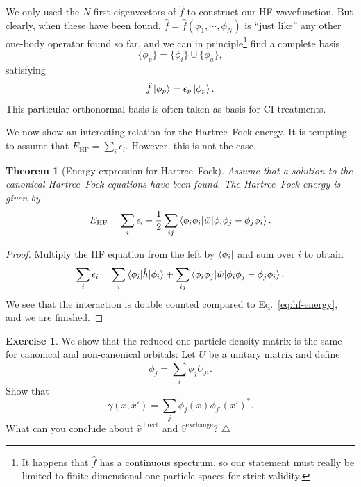 \documentclass{report}
\theoremstyle{plain}
\newtheorem{theorem}{Theorem}[chapter]
\theoremstyle{definition}
\newtheorem{exerc}{Exercise}[chapter]
\newcommand\xqed[1]{%
  \leavevmode\unskip\penalty9999 \hbox{}\nobreak\hfill
  \quad\hbox{#1}}
\newcommand\demo{\xqed{$\triangle$}}
\newenvironment{exercise}{\bigskip\begin{exerc}}{\demo\end{exerc}\bigskip}
\begin{document}
We only used the $N$ first eigenvectors of $\hat{f}$ to construct our
HF wavefunction. But clearly, when these have been found, $\hat{f}=
\hat{f}(\phi_1,\cdots,\phi_N)$ is ``just like'' any other one-body
operator found so far, and we can in principle\footnote{It happens
  that $\hat{f}$ has a continuous spectrum, so our statement must
  really be limited to finite-dimensional one-particle spaces for
  strict validity.} find a complete basis
\begin{equation}
  \{ \phi_p \} = \{\phi_i \} \cup \{\phi_a\},
\end{equation}
satisfying
\begin{equation}
  \hat{f}\ket{\phi_p} = \epsilon_p \ket{\phi_p}. \label{eq:hf-can-all}
\end{equation}
This particular orthonormal basis is often taken as basis for CI
treatments. 

We now show an interesting relation for the Hartree--Fock energy. It
is tempting to assume that $E_\text{HF} = \sum_i \epsilon_i$. However,
this is not the case.
\begin{theorem}[Energy expression for Hartree--Fock]
Assume that a solution to the canonical Hartree--Fock equations have
been found. The Hartree--Fock energy is given by
\begin{equation}
  E_\text{HF} = \sum_i \epsilon_i -
  \frac{1}{2}\sum_{ij}\braket{\phi_i\phi_i|\hat{w}|\phi_i\phi_j-\phi_j\phi_i}.
\end{equation}
\end{theorem}
\begin{proof}
  Multiply the HF equation from the left by $\bra{\phi_i}$ and sum
  over $i$ to obtain
  \begin{equation}
    \sum_i \epsilon_i = \sum_i \braket{\phi_i|\hat{h}|\phi_i} + \sum_{ij}
    \braket{\phi_i\phi_j|\hat{w}|\phi_i \phi_j - \phi_j \phi_i}.
  \end{equation}
  We see that the interaction is double counted compared to
  Eq.~\eqref{eq:hf-energy}, and we are finished.
\end{proof}


\begin{exercise}
  We show that the reduced one-particle density matrix is the same for
  canonical and non-canonical orbitals: Let $U$ be a unitary matrix
  and define
  \begin{equation}
    \tilde{\phi}_j = \sum_i \phi_j U_{ji}.
  \end{equation}
  Show that
  \begin{equation}
    \gamma(x,x') = \sum_j \tilde{\phi}_j(x)\tilde{\phi}_{j'}(x')^*.
  \end{equation}
  What can you conclude about $\hat{v}^\text{direct}$ and
  $\hat{v}^\text{exchange}$? 
\end{exercise}
\end{document}
